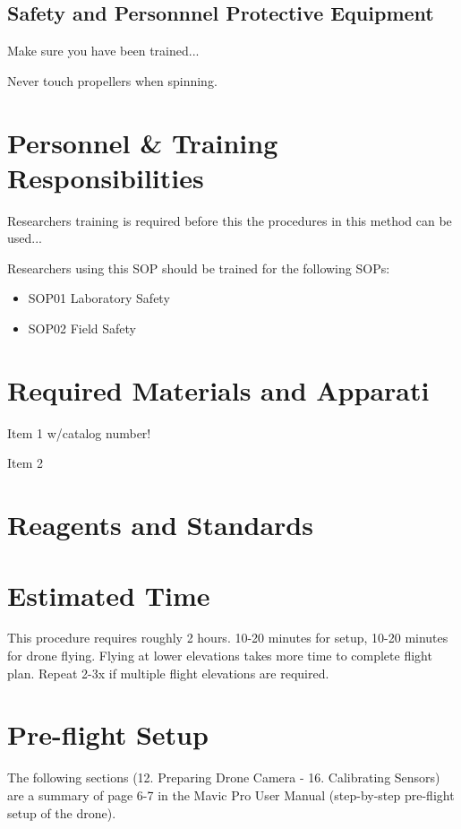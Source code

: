 \documentclass[12pt]{../SOP4_alpha}\usepackage[]{graphicx}\usepackage[]{color}
\begin{document}
\subsection{Safety and Personnnel Protective Equipment}

\NP Make sure you have been trained... 

\NP Never touch propellers when spinning. 

\section{Personnel \& Training Responsibilities}

\NP Researchers training is required before this the procedures in this method can be used... 

\NP Researchers using this SOP should be trained for the following SOPs:

\begin{itemize}
  \item SOP01 Laboratory Safety
  \item SOP02 Field Safety
\end{itemize}

\section{Required Materials and Apparati}

\NP Item 1 w/catalog number!

\NP Item 2

\section{Reagents and Standards}

\section{Estimated Time}

\NP This procedure requires roughly 2 hours. 10-20 minutes for setup, 10-20 minutes for drone flying. Flying at lower elevations takes more time to complete flight plan. Repeat 2-3x if multiple flight elevations are required.

\section{Pre-flight Setup}
\NP The following sections (12. Preparing Drone Camera - 16. Calibrating Sensors) are a summary of page 6-7 in the Mavic Pro User Manual (step-by-step pre-flight setup of the drone). 
\end{document}
